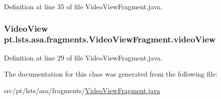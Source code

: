 Definition at line 35 of file Video\+View\+Fragment.\+java.

\hypertarget{classpt_1_1lsts_1_1asa_1_1fragments_1_1VideoViewFragment_a2a48c818563de3b28b98778928088cd1}{}
\subsubsection[{video\+View}]{\setlength{\rightskip}{0pt plus 5cm}Video\+View pt.\+lsts.\+asa.\+fragments.\+Video\+View\+Fragment.\+video\+View\hspace{0.3cm}{\ttfamily [private]}}\label{classpt_1_1lsts_1_1asa_1_1fragments_1_1VideoViewFragment_a2a48c818563de3b28b98778928088cd1}


Definition at line 29 of file Video\+View\+Fragment.\+java.



The documentation for this class was generated from the following file\+:\begin{DoxyCompactItemize}
\item 
src/pt/lsts/asa/fragments/\hyperlink{VideoViewFragment_8java}{Video\+View\+Fragment.\+java}\end{DoxyCompactItemize}

